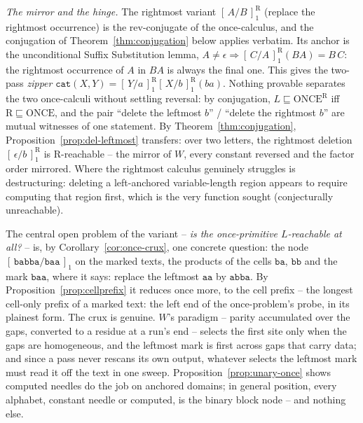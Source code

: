 \documentclass[runningheads,envcountsect]{llncs}
\renewenvironment{remark}
  {\rmfamily\trivlist\item[\hskip\labelsep{\itshape Remark.}]\ignorespaces}
  {\endtrivlist}
\begin{document}
\begin{remark}
    \emph{The mirror and the hinge.} The rightmost variant $[\,A/B\,]_1^{\mathrm{R}}$ (replace the rightmost occurrence) is the rev-conjugate of the once-calculus, and the conjugation of Theorem~\ref{thm:conjugation} below applies verbatim. Its anchor is the unconditional Suffix Substitution lemma, $A \neq \epsilon \Rightarrow [\,C/A\,]_1^{\mathrm{R}}(BA) = B\,C$: the rightmost occurrence of $A$ in $BA$ is always the final one. This gives the two-pass \emph{zipper} $\mathtt{cat}(X,Y) = [\,Y/a\,]_1^{\mathrm{R}}[\,X/b\,]_1^{\mathrm{R}}(ba)$. Nothing provable separates the two once-calculi without settling reversal: by conjugation, $L \sqsubseteq \mathrm{ONCE}^{\mathrm{R}}$ iff $\mathrm{R} \sqsubseteq \mathrm{ONCE}$, and the pair ``delete the leftmost $b$'' / ``delete the rightmost $b$'' are mutual witnesses of one statement. By Theorem~\ref{thm:conjugation}, Proposition~\ref{prop:del-leftmost} transfers: over two letters, the rightmost deletion $[\,\epsilon/b\,]_1^{\mathrm{R}}$ is $\mathrm{R}$-reachable -- the mirror of $W$, every constant reversed and the factor order mirrored. Where the rightmost calculus genuinely struggles is destructuring: deleting a left-anchored variable-length region appears to require computing that region first, which is the very function sought (conjecturally unreachable).

    The central open problem of the variant -- \emph{is the once-primitive $L$-reachable at all?} -- is, by Corollary~\ref{cor:once-crux}, one concrete question: the node $[\,\mathtt{babba}/\mathtt{baa}\,]_1$ on the marked texts, the products of the cells $\mathtt{ba}$, $\mathtt{bb}$ and the mark $\mathtt{baa}$, where it says: replace the leftmost $\mathtt{aa}$ by $\mathtt{abba}$. By Proposition~\ref{prop:cellprefix} it reduces once more, to the cell prefix -- the longest cell-only prefix of a marked text: the left end of the once-problem's probe, in its plainest form. The crux is genuine. $W$'s paradigm -- parity accumulated over the gaps, converted to a residue at a run's end -- selects the first site only when the gaps are homogeneous, and the leftmost mark is first across gaps that carry data; and since a pass never rescans its own output, whatever selects the leftmost mark must read it off the text in one sweep. Proposition~\ref{prop:unary-once} shows computed needles do the job on anchored domains; in general position, every alphabet, constant needle or computed, is the binary block node -- and nothing else.
\end{remark}
\end{document}
